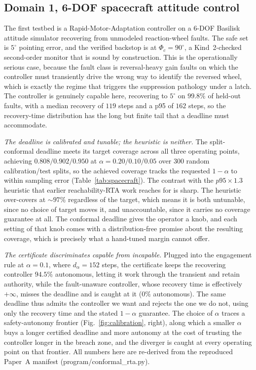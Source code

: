 \documentclass[journal]{IEEEtran}
\theoremstyle{plain}
\theoremstyle{definition}
\newcommand{\dalpha}{d_{\alpha}}
\begin{document}
\subsection{Domain 1, 6-DOF spacecraft attitude control}
The first testbed is a Rapid-Motor-Adaptation controller on a 6-DOF Basilisk attitude
simulator recovering from unmodeled reaction-wheel faults. The safe set is $5^\circ$ pointing
error, and the verified backstop is at $\Phi_c=90^\circ$, a Kind~2-checked second-order
monitor that is sound by construction. This is the operationally serious case, because the
fault class is reversal-heavy gain faults on which the controller must transiently drive the
wrong way to identify the reversed wheel, which is exactly the regime that triggers the
suppression pathology under a latch. The controller is genuinely capable here, recovering to
$5^\circ$ on $99.8\%$ of held-out faults, with a median recovery of $119$ steps and a p95 of
$162$ steps, so the recovery-time distribution has the long but finite tail that a deadline
must accommodate.

\emph{The deadline is calibrated and tunable; the heuristic is neither.} The split-conformal
deadline meets its target coverage across all three operating points, achieving
$0.808/0.902/0.950$ at $\alpha=0.20/0.10/0.05$ over $300$ random calibration/test splits, so
the achieved coverage tracks the requested $1-\alpha$ to within sampling error
(Table~\ref{tab:spacecraft}). The contrast with the $p95\times1.3$ heuristic that earlier
reachability-RTA work reaches for is sharp. The heuristic over-covers at ${\sim}97\%$
regardless of the target, which means it is both untunable, since no choice of target moves
it, and unaccountable, since it carries no coverage guarantee at all. The conformal deadline
gives the operator a knob, and each setting of that knob comes with a distribution-free
promise about the resulting coverage, which is precisely what a hand-tuned margin cannot
offer.

\emph{The certificate discriminates capable from incapable.} Plugged into the engagement rule
at $\alpha=0.1$, where $\dalpha=152$ steps, the certificate keeps the recovering controller
$94.5\%$ autonomous, letting it work through the transient and retain authority, while the
fault-unaware controller, whose recovery time is effectively $+\infty$, misses the deadline
and is caught at it ($0\%$ autonomous). The same deadline thus admits the controller we want
and rejects the one we do not, using only the recovery time and the stated $1-\alpha$
guarantee. The choice of $\alpha$ traces a safety-autonomy frontier (Fig.~\ref{fig:calibration},
right), along which a smaller $\alpha$ buys a longer certified deadline and more autonomy at
the cost of trusting the controller longer in the breach zone, and the diverger is caught at
every operating point on that frontier. All numbers here are re-derived from the reproduced
Paper~A manifest (program/conformal\_rta.py).
\end{document}
